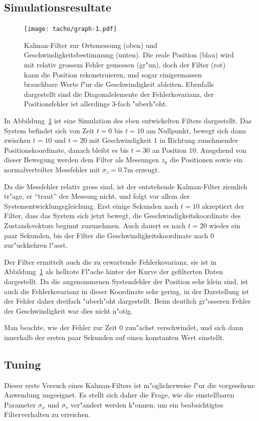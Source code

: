 \subsection{Simulationsresultate}
\begin{figure}
\centering
\texttt{[image: tacho/graph-1.pdf]}
\caption{Kalman-Filter zur Ortsmessung (oben) und Geschwindigkeitsbestimmung
(unten).
Die reale Position ({\color{blue}blau}) wird mit relativ grossem
Fehler gemessen ({\color{green}gr"un}), doch der Filter ({\color{red}rot})
kann die Position rekonstruieren, und sogar einigermassen brauchbare
Werte f"ur die Geschwindigkeit ableiten.
Ebenfalls dargestellt sind die Diagonalelemente der Fehlerkovarianz,
der Positionsfehler ist allerdings 3-fach "uberh"oht.
\label{tacho-graph}}
\end{figure}
In Abbildung~\ref{tacho-graph} ist eine Simulation des eben entwickelten
Filters dargestellt.
Das System befindet sich von Zeit $t=0$ bis $t=10$ am Nullpunkt, bewegt
sich dann zwischen $t=10$ und $t=20$ mit Geschwindigkeit $1$ in Richtung
zunehmender Positionskoordinate, danach bleibt es bis $t=30$ an Position $10$.
Ausgehend von dieser Bewegung werden dem Filter als Messungen $z_k$ die
Positionen sowie ein normalverteilter Messfehler mit $\sigma_z=0.7\text{m}$
erzeugt.

Da die Messfehler relativ gross sind, ist der entstehende Kalman-Filter
ziemlich tr"age, er ``traut'' der Messung nicht, und folgt vor allem der
Systementwicklungsgleichung.
Erst einige Sekunden nach $t=10$ akzeptiert der Filter, dass das System
sich jetzt bewegt, die Geschwindigkeitskoordinate des Zustandsvektors beginnt
zuzunehmen.
Auch dauert es nach $t=20$ wieder ein paar Sekunden, bis der Filter
die Geschwindigkeitskoordinate nach $0$ zur"uckkehren l"asst.

Der Filter ermittelt auch die zu erwartende Fehlerkovarianz, sie ist
in Abbildung~\ref{tacho-graph} als hellrote Fl"ache hinter der
Kurve der gefilterten Daten dargestellt.
Da die angenommenen Systemfehler der Position sehr klein sind, ist auch die
Fehlerkovarianz in dieser Koordinate sehr gering, in der Darstellung
ist der Fehler daher dreifach "uberh"oht dargestellt.
Beim deutlich gr"osseren Fehler der Geschwindigkeit war dies nicht
n"otig.

Man beachte, wie der Fehler zur Zeit $0$ zun"achst verschwindet, und
sich dann innerhalb der ersten paar Sekunden auf einen konstanten
Wert einstellt.

\subsection{Tuning}
Dieser erste Versuch eines Kalman-Filters ist m"oglicherweise f"ur
die vorgesehene Anwendung ungeeignet.
Es stellt sich daher die Frage, wie die einstellbaren Parameter
$\sigma_x$ und $\sigma_v$ ver"andert werden k"onnen,
um ein beabsichtigtes Filterverhalten zu erreichen.

